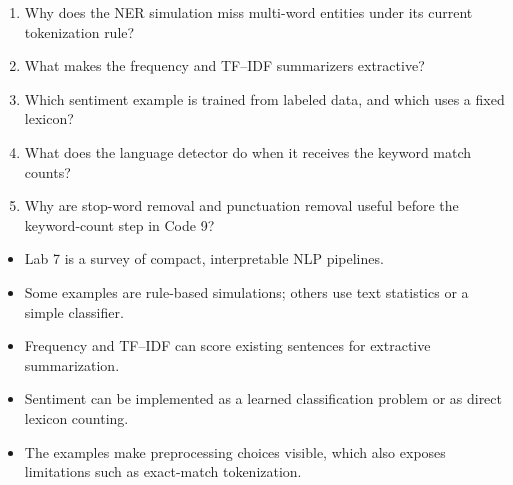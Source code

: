 

\clearpage
\begin{quickcheck}
\begin{enumerate}
  \item Why does the NER simulation miss multi-word entities under its current tokenization rule?
  \item What makes the frequency and TF--IDF summarizers extractive?
  \item Which sentiment example is trained from labeled data, and which uses a fixed lexicon?
  \item What does the language detector do when it receives the keyword match counts?
  \item Why are stop-word removal and punctuation removal useful before the keyword-count step in Code 9?
\end{enumerate}
\end{quickcheck}

\begin{chapterrecap}
\begin{itemize}
  \item Lab 7 is a survey of compact, interpretable NLP pipelines.
  \item Some examples are rule-based simulations; others use text statistics or a simple classifier.
  \item Frequency and TF--IDF can score existing sentences for extractive summarization.
  \item Sentiment can be implemented as a learned classification problem or as direct lexicon counting.
  \item The examples make preprocessing choices visible, which also exposes limitations such as exact-match tokenization.
\end{itemize}
\end{chapterrecap}
